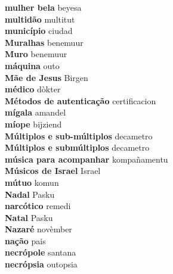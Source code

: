 \textbf{ mulher bela  } beyesa \\
\textbf{ multidão  } multitut \\
\textbf{ município  } ciudad \\
\textbf{ Muralhas  } benemuur \\
\textbf{ Muro  } benemuur \\
\textbf{ máquina  } outo \\
\textbf{ Mãe de Jesus  } Birgen \\
\textbf{ médico  } dòkter \\
\textbf{ Métodos de autenticação  } certificacion \\
\textbf{ mígala  } amandel \\
\textbf{ míope  } bijziend \\
\textbf{ Múltiplos e sub-múltiplos  } decametro \\
\textbf{ Múltiplos e submúltiplos  } decametro \\
\textbf{ música para acompanhar  } kompañamentu \\
\textbf{ Músicos de Israel  } Israel \\
\textbf{ mútuo  } komun \\
\textbf{ Nadal  } Pasku \\
\textbf{ narcótico  } remedi \\
\textbf{ Natal  } Pasku \\
\textbf{ Nazaré  } novèmber \\
\textbf{ nação  } pais \\
\textbf{ necrópole  } santana \\
\textbf{ necrópsia  } outopsia \\

